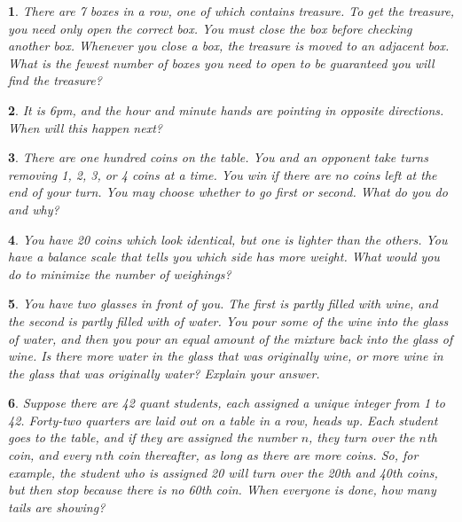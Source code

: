 \documentclass{report}
\newtheorem{problem}{}
\numberwithin{problem}{chapter} %
\begin{document}
\begin{problem}
There are 7 boxes in a row, one of which contains treasure. To get the treasure, you need only open the correct box. You must close the box before checking another box. Whenever you close a box, the treasure is moved to an adjacent box. What is the fewest number of boxes you need to open to be guaranteed you will find the treasure?
\end{problem}

\begin{problem}
It is 6pm, and the hour and minute hands are pointing in opposite directions. When will this happen next?
\end{problem}

\begin{problem}
There are one hundred coins on the table. You and an opponent take turns removing 1, 2, 3, or 4 coins at a time. You win if there are no coins left at the end of your turn. You may choose whether to go first or second. What do you do and why?
\end{problem}

\begin{problem}
You have 20 coins which look identical, but one is lighter than the others. You have a balance scale that tells you which side has more weight. What would you do to minimize the number of weighings?
\end{problem}

\begin{problem}
You have two glasses in front of you. The first is partly filled with wine, and the second is partly filled with of water. You pour some of the wine into the glass of water, and then you pour an equal amount of the mixture back into the glass of wine. Is there more water in the glass that was originally wine, or more wine in the glass that was originally water? Explain your answer.
\end{problem}

\begin{problem}
Suppose there are 42 quant students, each assigned a unique integer from 1 to 42. Forty-two quarters are laid out on a table in a row, heads up. Each student goes to the table, and if they are assigned the number $n$, they turn over the $n$th coin, and every $n$th coin thereafter, as long as there are more coins. So, for example, the student who is assigned 20 will turn over the 20th and 40th coins, but then stop because there is no 60th coin. When everyone is done, how many tails are showing?
\end{problem}
\end{document}
